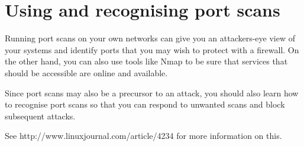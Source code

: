 \documentclass{article}
\begin{document}
\section{Using and recognising port scans}
Running port scans on your own networks can give you an attackers-eye view of your systems and identify ports that you may wish to protect with a firewall.  On the other hand, you can also use tools like Nmap to be sure that services that should be accessible are online and available.

Since port scans may also be a precursor to an attack, you should also learn how to recognise port scans so that you can respond to unwanted scans and block subsequent attacks.  

See http://www.linuxjournal.com/article/4234 for more information on this.

 
\end{document}
